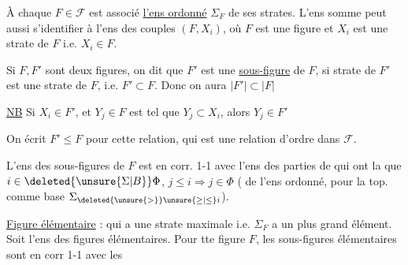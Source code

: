 À chaque $F\in\mathcal{F}$ est associé \uline{l'ens ordonné} $\Sigma_F$ de ses strates. L'ens somme
{\reversemarginpar{}}
peut aussi s'identifier à l'ens des couples $(F,X_i)$,  où $F$ est une figure et $X_i$ est une strate de $F$ i.e. $X_i\in F$.

Si $F,F'$ sont deux figures, on dit que $F'$ est une \uline{sous-figure} de $F$, si  strate de $F'$ est une strate de $F$, i.e. $F'\subset F$. Donc  on aura   $\lvert F'\rvert\subset\lvert F\rvert$

\uline{NB} Si $X_i\in F'$, et $Y_j\in F$ est tel que $Y_j\subset X_i$, alors $Y_j\in F'$



On écrit $F'\leq F$ pour cette relation, qui est une relation d'ordre dans $\mathcal{F}$.

L'ens des sous-figures de $F$ est en corr. 1-1 avec l'ens des parties  de   qui ont la  que  $i\in\deleted{\unsure{\Sigma|B}}\Phi$, $j\leq i\Rightarrow j\in\Phi$
(   de l'ens  ordonné, pour la top.   comme base    $\Sigma_{\deleted{\unsure{>}}\unsure{\geq|\leq}i}$).


\uline{Figure élémentaire} : qui a une strate maximale i.e. $\Sigma_F$ a un plus grand élément. Soit  l'ens des figures élémentaires.  Pour tte figure $F$, les sous-figures élémentaires sont en corr 1-1 avec les


